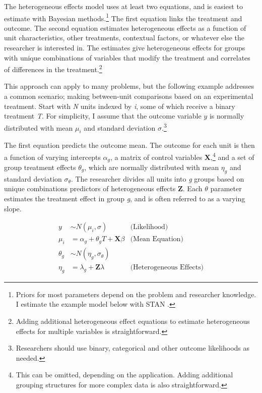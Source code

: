 \documentclass[12pt]{article}
\begin{document}
The heterogeneous effects model uses at least two equations, and is easiest to estimate with Bayesian methods.\footnote{Priors for most parameters depend on the problem and researcher knowledge. I estimate the example model below with STAN \citep{Carpenteretal2016}.} 
The first equation links the treatment and outcome. 
The second equation estimates heterogeneous effects as a function of unit characteristics, other treatments, contextual factors, or whatever else the researcher is interested in. 
The estimates give heterogeneous effects for groups with unique combinations of variables that modify the treatment and correlates of differences in the treatment.\footnote{Adding additional heterogeneous effect equations to estimate heterogeneous effects for multiple variables is straightforward.}  


This approach can apply to many problems, but the following example addresses a common scenario; making between-unit comparisons based on an experimental treatment.    
Start with \textit{N} units indexed by \textit{i}, some of which receive a binary treatment \textit{T}.
For simplicity, I assume that the outcome variable ${y}$ is normally distributed with mean $\mu_i$ and standard deviation $\sigma$.\footnote{Researchers should use binary, categorical and other outcome likelihoods as needed.}


The first equation predicts the outcome mean. 
The outcome for each unit is then a function of varying intercepts $\alpha_g$, a matrix of control variables \textbf{X},\footnote{This can be omitted, depending on the application. Adding additional grouping structures for more complex data is also straightforward.} and a set of group treatment effects $\theta_g$, which are normally distributed with mean $\eta_g$ and standard deviation $\sigma_\theta$. 
The researcher divides all units into \textit{g} groups based on unique combinations predictors of heterogeneous effects \textbf{Z}. 
Each $\theta$ parameter estimates the treatment effect in group \textit{g}, and is often referred to as a varying slope. 


\begin{equation}
\begin{aligned}
y &\sim N(\mu_i, \sigma) &\text{(Likelihood)} \\
\mu_i &= \alpha_g + \theta_g \textit{T} + \textbf{X} \beta &\text{(Mean Equation)}  \\
\theta_g &\sim N(\eta_g, \sigma_\theta) \\ 
\eta_g &= \lambda_g + \textbf{Z} \lambda &\text{(Heterogeneous Effects)} 
\end{aligned}
\end{equation}
\end{document}
